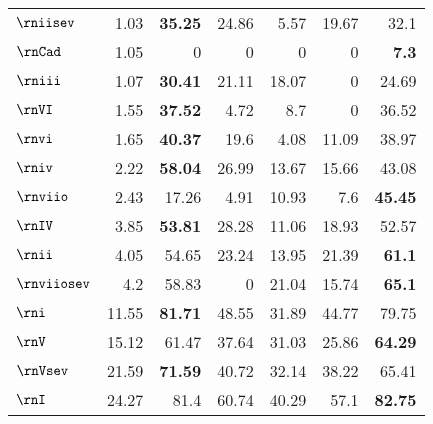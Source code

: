 \begin{tabular}{l|rrrrrr}
$\rniisev$   & 1.03                   & \textbf{35.25} & 24.86          & 5.57  & 19.67 & 32.1           \\
$\rnCad$   & 1.05                   & 0              & 0              & 0     & 0     & \textbf{7.3}   \\
$\rniii$   & 1.07                   & \textbf{30.41} & 21.11          & 18.07 & 0     & 24.69          \\
$\rnVI$    & 1.55                   & \textbf{37.52} & 4.72           & 8.7   & 0     & 36.52          \\
$\rnvi$    & 1.65                   & \textbf{40.37} & 19.6           & 4.08  & 11.09 & 38.97          \\
$\rniv$    & 2.22                   & \textbf{58.04} & 26.99          & 13.67 & 15.66 & 43.08          \\
$\rnviio$  & 2.43                   & 17.26          & 4.91           & 10.93 & 7.6   & \textbf{45.45} \\
$\rnIV$    & 3.85                   & \textbf{53.81} & 28.28          & 11.06 & 18.93 & 52.57          \\
$\rnii$    & 4.05                   & 54.65          & 23.24          & 13.95 & 21.39 & \textbf{61.1}  \\
$\rnviiosev$ & 4.2                    & 58.83          & 0              & 21.04 & 15.74 & \textbf{65.1}  \\
$\rni$     & 11.55                  & \textbf{81.71} & 48.55          & 31.89 & 44.77 & 79.75          \\
$\rnV$     & 15.12                  & 61.47          & 37.64          & 31.03 & 25.86 & \textbf{64.29} \\
$\rnVsev$    & 21.59                  & \textbf{71.59} & 40.72          & 32.14 & 38.22 & 65.41          \\
$\rnI$     & 24.27                  & 81.4           & 60.74          & 40.29 & 57.1  & \textbf{82.75}
\end{tabular}
